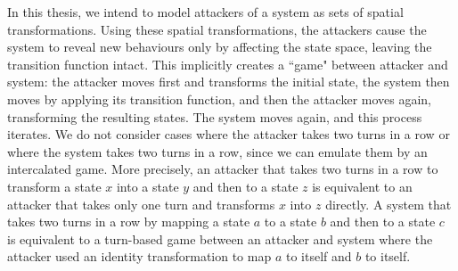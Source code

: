 

In this thesis, we intend to model attackers of a system as sets of spatial transformations. Using these spatial transformations, the attackers cause the system to reveal new behaviours only by affecting the state space, leaving the transition function intact. This implicitly creates a ``game" between attacker and system: the attacker moves first and transforms the initial state, the system then moves by applying its transition function, and then the attacker moves again, transforming the resulting states. The system moves again, and this process iterates. We do not consider cases where the attacker takes two turns in a row or where the system takes two turns in a row, since we can emulate them by an intercalated game. More precisely, an attacker that takes two turns in a row to transform a state $x$ into a state $y$ and then to a state $z$ is equivalent to an attacker that takes only one turn and transforms $x$ into $z$ directly. A system that takes two turns in a row by mapping a state $a$ to a state $b$ and then to a state $c$ is equivalent to a turn-based game between an attacker and system where the attacker used an identity transformation to map $a$ to itself and $b$ to itself. 

